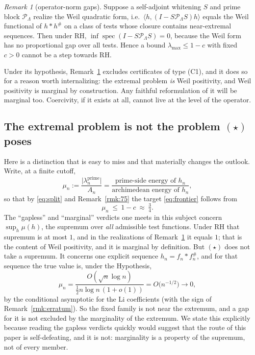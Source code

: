 \documentclass[11pt]{amsart}
\theoremstyle{definition}
\theoremstyle{remark}
\newtheorem{remark}[theorem]{Remark}
\theoremstyle{definition}
\begin{document}
\begin{remark}[operator-norm gaps]\label{prop:no-gap}
Suppose a self-adjoint whitening $S$ and prime block $\mathcal P_\Lambda$ realize the Weil
quadratic form, i.e.\ $\langle h,(I-S\mathcal P_\Lambda S)h\rangle$ equals the Weil functional of
$h*h^\#$ on a class of tests whose closure contains near-extremal sequences. Then under RH,
$\inf\operatorname{spec}(I-S\mathcal P_\Lambda S)=0$, because the Weil form has no proportional
gap over all tests. Hence a bound $\lambda_{\max}\le1-c$ with fixed $c>0$ cannot be a step
towards RH.
\end{remark}

Under its hypothesis, Remark~\ref{prop:no-gap} excludes certificates of type (C1),
and it does so for a reason worth internalizing: the extremal problem \emph{is} Weil positivity,
and Weil positivity is marginal by construction. Any faithful reformulation of it will be marginal
too. Coercivity, if it exists at all, cannot live at the level of the operator.

\subsection{The extremal problem is not the problem $(\star)$ poses}\label{sec:fixed-family}

Here is a distinction that is easy to miss and that materially changes the outlook. Write, at a
finite cutoff,
\begin{equation}\label{eq:mu-n}
   \mu_n:=\frac{\bigl|\lambda_n^{\mathrm{prime}}\bigr|}{A_n}
   =\frac{\text{prime-side energy of }h_n}{\text{archimedean energy of }h_n},
\end{equation}
so that by \eqref{eq:split} and Remark~\ref{rmk:75} the target \eqref{eq:frontier} follows from
\begin{equation}\label{eq:mu-target}
   \mu_n\ \le\ 1-c\ \approx\ \tfrac34 .
\end{equation}
The ``gapless'' and ``marginal'' verdicts one meets in this subject concern
$\sup_h\mu(h)$, the supremum over \emph{all} admissible test functions. Under RH that supremum is at most $1$, and in the realizations of
Remark~\ref{prop:no-gap} it equals $1$;
that is the content of Weil positivity, and it is marginal by definition. But $(\star)$ does
not take a supremum. It concerns one explicit sequence $h_n=f_n*f_n^{\#}$, and for that sequence
the true value is, under the Hypothesis,
\begin{equation}\label{eq:mu-true}
   \mu_n=\frac{O(\sqrt n\log n)}{\tfrac12n\log n\,(1+o(1))}=O\bigl(n^{-1/2}\bigr)\longrightarrow0 ,
\end{equation}
by the conditional asymptotic for the Li coefficients \cite{Lagarias2007} (with the sign of
Remark~\ref{rmk:erratum}).
So the fixed family is not near the extremum, and a gap for it is not excluded by the marginality
of the extremum. We state this explicitly because reading the gapless verdicts quickly would
suggest that the route of this paper is self-defeating, and it is not: marginality is a property of
the supremum, not of every member.
\end{document}
